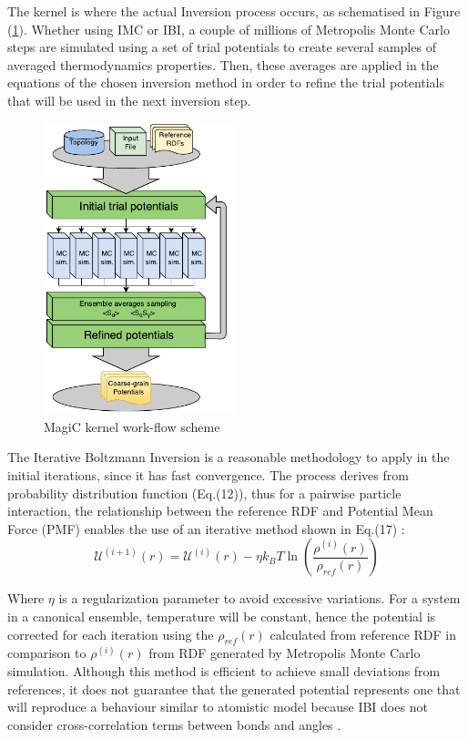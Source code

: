 \documentclass[10pt,a4paper,twoside]{article}
\begin{document}
 The kernel is where the actual Inversion process occurs, as schematised in Figure (\ref{Fig:kernel}). Whether using IMC or IBI, a couple of millions of Metropolis Monte Carlo steps are simulated using a set of trial potentials to create several samples of averaged thermodynamics properties. Then, these averages are applied in the equations of the chosen inversion method in order to refine the trial potentials that will be used in the next inversion step.
 \begin{figure}[ht!]
  \begin{center}
	\includegraphics[width=0.50\textwidth]{./images/magiccore}
	\caption{MagiC kernel work-flow scheme}
	\label{Fig:kernel}
  \end{center}
\end{figure}
 
 The Iterative Boltzmann Inversion is a reasonable methodology to apply in the initial iterations, since it has fast convergence. The process derives from probability distribution function (Eq.(12)), thus for a pairwise particle interaction, the relationship between the reference RDF and Potential Mean Force (PMF) enables the use of an iterative method shown in Eq.(17) \cite{ibi}:
   \begin{equation}
\mathcal{U}^{(i+1)}(r) = \mathcal{U}^{(i)}(r) - \eta k_B T \ln{\left(\dfrac{\rho^{(i)}(r)}{\rho_{ref}(r)}\right)}
\label{eqn:ibi}
\end{equation}

 Where $\eta$ is a regularization parameter to avoid excessive variations. For a system in a canonical ensemble, temperature will be constant, hence the potential is corrected for each iteration using the $\rho_{ref}(r)$ calculated from reference RDF in comparison to $\rho^{(i)}(r)$ from  RDF generated by Metropolis Monte Carlo simulation. Although this method is efficient to achieve small deviations from references, it does not guarantee that the generated potential represents one that will reproduce a behaviour similar to atomistic model because IBI does not consider cross-correlation terms between bonds and angles \cite{magic}.   
 
\end{document}
